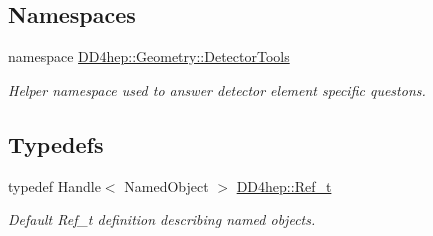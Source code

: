 \subsection*{Namespaces}
\begin{DoxyCompactItemize}
\item 
namespace \hyperlink{namespace_d_d4hep_1_1_geometry_1_1_detector_tools}{DD4hep::Geometry::DetectorTools}


\begin{DoxyCompactList}\small\item\em Helper namespace used to answer detector element specific questons. \item\end{DoxyCompactList}\end{DoxyCompactItemize}
\subsection*{Typedefs}
\begin{DoxyCompactItemize}
\item 
typedef Handle$<$ NamedObject $>$ \hyperlink{group___d_d4_h_e_p___g_e_o_m_e_t_r_y_ga40af83be6718bb8828a3d83dc7f8c930}{DD4hep::Ref\_\-t}
\begin{DoxyCompactList}\small\item\em Default Ref\_\-t definition describing named objects. \item\end{DoxyCompactList}\end{DoxyCompactItemize}
